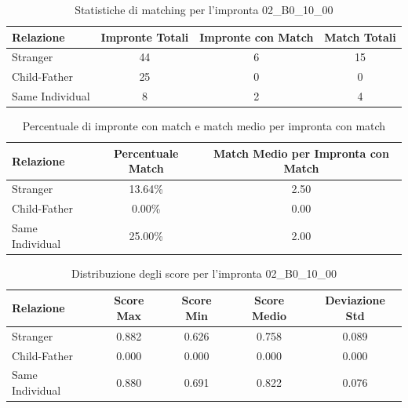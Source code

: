 \begin{table}[htbp]
\centering
\caption{Statistiche di matching per l'impronta 02\_B0\_10\_00}
\label{tab:results_02_B0_10_00}
\begin{tabular}{|l|c|c|c|}
\hline
\textbf{Relazione} & \textbf{Impronte Totali} & \textbf{Impronte con Match} & \textbf{Match Totali} \\
\hline
Stranger & 44 & 6 & 15 \\
\hline
Child-Father & 25 & 0 & 0 \\
\hline
Same Individual & 8 & 2 & 4 \\
\hline
\end{tabular}
\end{table}


\begin{table}[htbp]
\centering
\caption{Percentuale di impronte con match e match medio per impronta con match}
\label{tab:match_percentage_02_B0_10_00}
\begin{tabular}{|l|c|c|}
\hline
\textbf{Relazione} & \textbf{Percentuale Match} & \textbf{Match Medio per Impronta con Match} \\
\hline
Stranger & 13.64\% & 2.50 \\
\hline
Child-Father & 0.00\% & 0.00 \\
\hline
Same Individual & 25.00\% & 2.00 \\
\hline
\end{tabular}
\end{table}


\begin{table}[htbp]
\centering
\caption{Distribuzione degli score per l'impronta 02\_B0\_10\_00}
\label{tab:scores_02_B0_10_00}
\begin{tabular}{|l|c|c|c|c|}
\hline
\textbf{Relazione} & \textbf{Score Max} & \textbf{Score Min} & \textbf{Score Medio} & \textbf{Deviazione Std} \\
\hline
Stranger & 0.882 & 0.626 & 0.758 & 0.089 \\
\hline
Child-Father & 0.000 & 0.000 & 0.000 & 0.000 \\
\hline
Same Individual & 0.880 & 0.691 & 0.822 & 0.076 \\
\hline
\end{tabular}
\end{table}

